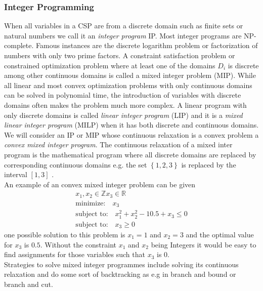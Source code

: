 \subsubsection{Integer Programming}
When all variables in a CSP are from a discrete domain such as finite sets or natural numbers we call it an \emph{integer program} IP. Most integer programs are NP-complete. Famous instances are the discrete logarithm problem or factorization of numbers with only two prime factors. A constraint satisfaction problem or constrained optimization problem where at least one of the domains $D_i$ is discrete among other continuous domains is called a mixed integer problem (MIP). While all linear and most convex optimization problems with only continuous domains can be solved in polynomial time, the introduction of variables with discrete domains often makes the problem much more complex. A linear program with only discrete domains is called \emph{linear integer program} (LIP) and it is a \emph{mixed linear integer program} (MILP) when it has both discrete and continuous domains. We will consider an IP or MIP whose continuous relaxation is a convex problem a \emph{convex mixed integer program}. The continuous relaxation of a mixed inter program is the mathematical program where all discrete
domains are replaced by corresponding continuous domains e.g. the set 
$\left\lbrace 1,2,3 \right\rbrace $
 is replaced by the interval 
 $\left[ 1,3 \right] $
 .\\
An example of an convex mixed integer problem can be given
\begin{eqnarray}
x_1,x_2\in \mathbb{Z} x_3\in \mathbb{R}\\
\text{minimize:}\quad x_3 \\
\text{subject to:}\quad x_1^2 + x_2^2 - 10.5 + x_3 \leq 0 \\
\text{subject to:}\quad x_3 \geq 0
\end{eqnarray}
one possible solution to this problem is $x_1=1$ and $x_2=3$ and the optimal value for $x_3$ is $0.5$. Without the constraint $x_1$ and $x_2$ being Integers it would be easy to find assignments for those variables such that $x_3$ is $0$.\\
Strategies to solve mixed integer programmes include solving its continuous relaxation and do some sort of backtracking as e.g in branch and bound or branch and cut.
